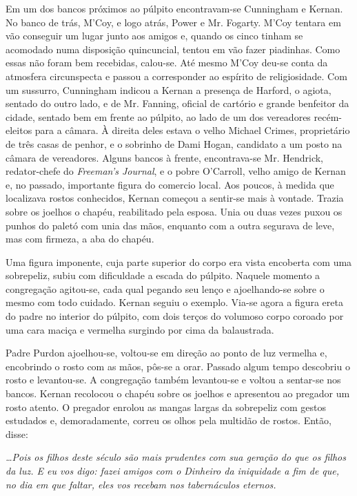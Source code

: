 Em um dos bancos próximos ao púlpito encontravam-se Cunningham e
Kernan. No banco de trás, M'Coy, e logo atrás, Power e Mr. Fogarty.
M'Coy tentara em vão conseguir um lugar junto aos amigos e, quando os
cinco tinham se acomodado numa disposição quincuncial, tentou em vão
fazer piadinhas. Como essas não foram bem recebidas, calou-se. Até
mesmo M'Coy deu-se conta da atmosfera circunspecta e passou a
corresponder ao espírito de religiosidade. Com um sussurro, Cunningham
indicou a Kernan a presença de Harford, o agiota, sentado do outro
lado, e de Mr. Fanning, oficial de cartório e grande benfeitor da
cidade, sentado bem em frente ao púlpito, ao lado de um dos vereadores
recém-eleitos para a câmara. À direita deles estava o velho Michael
Crimes, proprietário de três casas de penhor, e o sobrinho de Dami
Hogan, candidato a um posto na câmara de vereadores. Alguns bancos à
frente, encontrava-se Mr. Hendrick, redator-chefe do \textit{Freeman's
Journal}, e o pobre O'Carroll, velho amigo de Kernan e, no passado,
importante figura do comercio local. Aos poucos, à medida que
localizava rostos conhecidos, Kernan começou a sentir-se mais à
vontade. Trazia sobre os joelhos o chapéu, reabilitado pela esposa.
Unia ou duas vezes puxou os punhos do paletó com unia das mãos,
enquanto com a outra segurava de leve, mas com firmeza, a aba do
chapéu.

Uma figura imponente, cuja parte superior do corpo era vista encoberta
com uma sobrepeliz, subiu com dificuldade a escada do púlpito. Naquele
momento a congregação agitou-se, cada qual pegando seu lenço e ajoelhando-se sobre o mesmo com todo
cuidado. Kernan seguiu o exemplo. Via-se agora a figura ereta
do padre no interior do púlpito, com dois terços do volumoso
corpo coroado por uma cara maciça e vermelha surgindo por
cima da balaustrada.

Padre Purdon ajoelhou-se, voltou-se em direção ao ponto de luz
vermelha e, encobrindo o rosto com as mãos, pôs-se a orar. Passado
algum tempo descobriu o rosto e levantou-se. A congregação também
levantou-se e voltou a sentar-se nos bancos. Kernan recolocou o
chapéu sobre os joelhos e apresentou ao pregador um rosto atento. O
pregador enrolou as mangas largas da sobrepeliz
com gestos estudados e, demoradamente, correu os olhos pela multidão
de rostos. Então, disse:

{\itshape
\ldots{}Pois os filhos deste século são mais prudentes com sua geração do
que os filhos da luz. E eu vos digo: fazei amigos com o Dinheiro da
iniquidade a fim de que, no dia em que faltar, eles vos recebam nos
tabernáculos eternos.
\par}

